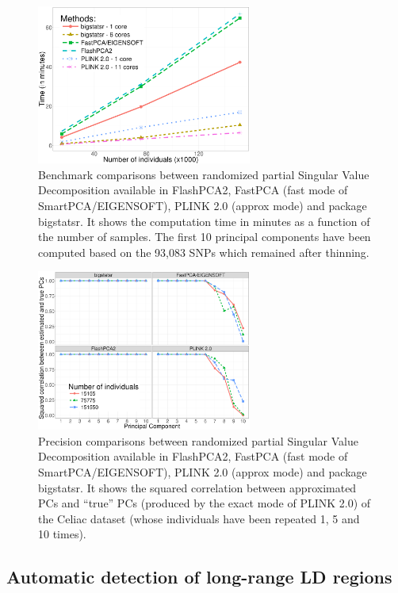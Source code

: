 \documentclass{bioinfo}
\begin{document}
\begin{figure}[!tpb]
\centerline{\includegraphics[width=200pt]{benchmark-pca.png}}
\caption{Benchmark comparisons between randomized partial Singular Value Decomposition available in FlashPCA2, FastPCA (fast mode of SmartPCA/EIGENSOFT), PLINK 2.0 (approx mode) and package bigstatsr. It shows the computation time in minutes as a function of the number of samples. The first 10 principal components have been computed based on the 93,083 SNPs which remained after thinning.}\label{fig:bench-pca}
\end{figure}

\begin{figure}[!tpb]
\centerline{\includegraphics[width=200pt]{precision-pca.png}}
\caption{Precision comparisons between randomized partial Singular Value Decomposition available in FlashPCA2, FastPCA (fast mode of SmartPCA/EIGENSOFT), PLINK 2.0 (approx mode) and package bigstatsr. It shows the squared correlation between approximated PCs and ``true'' PCs (produced by the exact mode of PLINK 2.0) of the Celiac dataset (whose individuals have been repeated 1, 5 and 10 times).}\label{fig:prec-pca}
\end{figure}

\subsection{Automatic detection of long-range LD regions}
\end{document}
